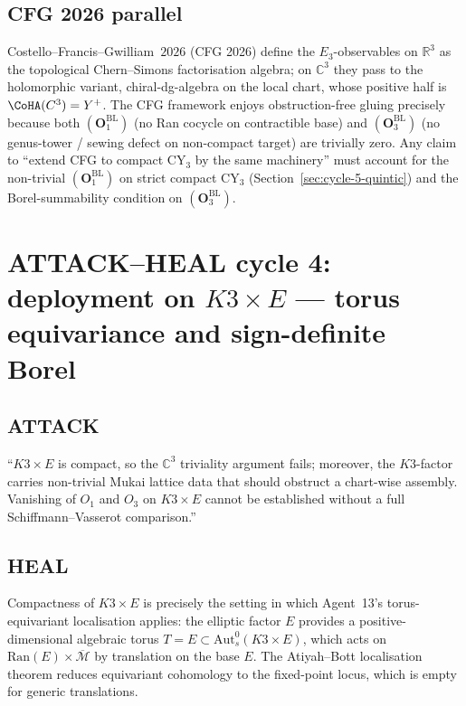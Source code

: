 \documentclass[11pt]{amsart}
\newcommand{\Ran}{\mathrm{Ran}}
\newcommand{\Mbar}{\overline{\mathcal{M}}}
\newcommand{\bC}{\mathbb{C}}
\newcommand{\bR}{\mathbb{R}}
\newcommand{\Aut}{\mathrm{Aut}}
\begin{document}
\subsection{CFG 2026 parallel}

Costello--Francis--Gwilliam~$2026$ (CFG 2026) define the
$E_3$-observables on $\bR^3$ as the topological Chern--Simons
factorisation algebra; on $\bC^3$ they pass to the holomorphic
variant, chiral-dg-algebra on the local chart, whose positive half
is $\CoHA(\bC^3) = Y^+$. The CFG framework enjoys obstruction-free
gluing precisely because both $(\mathbf{O}_1^{\mathrm{BL}})$
(no Ran cocycle on contractible base) and
$(\mathbf{O}_3^{\mathrm{BL}})$ (no genus-tower / sewing defect on
non-compact target) are trivially zero. Any claim to ``extend CFG
to compact CY$_3$ by the same machinery'' must account for the
non-trivial $(\mathbf{O}_1^{\mathrm{BL}})$ on strict compact CY$_3$
(Section~\ref{sec:cycle-5-quintic}) and the Borel-summability
condition on $(\mathbf{O}_3^{\mathrm{BL}})$.

\section{ATTACK--HEAL cycle 4: deployment on $K3 \times E$ ---
torus equivariance and sign-definite Borel}
\label{sec:cycle-4-k3xe}

\subsection*{ATTACK}

``$K3 \times E$ is compact, so the $\bC^3$ triviality argument
fails; moreover, the $K3$-factor carries non-trivial Mukai lattice
data that should obstruct a chart-wise assembly. Vanishing of
$O_1$ and $O_3$ on $K3 \times E$ cannot be established without a
full Schiffmann--Vasserot comparison.''

\subsection*{HEAL}

Compactness of $K3 \times E$ is precisely the setting in which
Agent~13's torus-equivariant localisation applies: the elliptic
factor $E$ provides a positive-dimensional algebraic torus
$T = E \subset \Aut^0_s(K3 \times E)$, which acts on
$\Ran(E) \times \Mbar$ by translation on the base $E$. The
Atiyah--Bott localisation theorem reduces equivariant cohomology
to the fixed-point locus, which is empty for generic translations.
\end{document}
